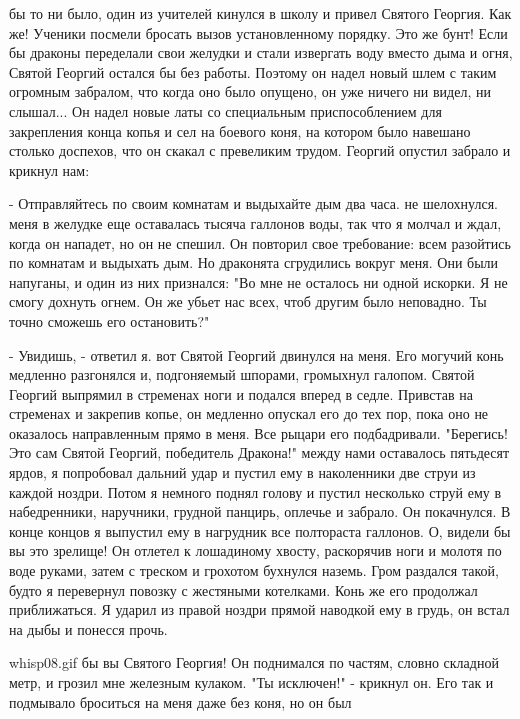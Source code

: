  бы то ни было, один из учителей кинулся в школу и привел 
Святого Георгия. Как же! Ученики посмели бросать вызов установленному 
порядку. Это же бунт! Если бы драконы переделали свои желудки и стали 
извергать воду вместо дыма и огня, Святой Георгий остался бы без 
работы. Поэтому он надел новый шлем с таким огромным забралом, что 
когда оно было опущено, он уже ничего ни видел, ни слышал... Он надел 
новые латы со специальным приспособлением для закрепления конца копья 
и сел на боевого коня, на котором было навешано столько доспехов, что 
он скакал с превеликим трудом.
 Георгий опустил забрало и крикнул нам:
\par- Отправляйтесь по своим комнатам и выдыхайте дым два часа.
 не шелохнулся.
 меня в желудке еще оставалась тысяча галлонов воды, так что я 
молчал и ждал, когда он нападет, но он не спешил. Он повторил свое 
требование: всем разойтись по комнатам и выдыхать дым. Но драконята 
сгрудились вокруг меня. Они были напуганы, и один из них признался: 
"Во мне не осталось ни одной искорки. Я не смогу дохнуть огнем. Он же 
убьет нас всех, чтоб другим было неповадно. Ты точно сможешь его 
остановить?"
\par- Увидишь, - ответил я.
 вот Святой Георгий двинулся на меня. Его могучий конь медленно 
разгонялся и, подгоняемый шпорами, громыхнул галопом. Святой Георгий 
выпрямил в стременах ноги и подался вперед в седле. Привстав на 
стременах и закрепив копье, он медленно опускал его до тех пор, пока 
оно не оказалось направленным прямо в меня. Все рыцари его 
подбадривали. "Берегись! Это сам Святой Георгий, победитель Дракона!"
 между нами оставалось пятьдесят ярдов, я попробовал дальний 
удар и пустил ему в наколенники две струи из каждой ноздри. Потом я 
немного поднял голову и пустил несколько струй ему в набедренники, 
наручники, грудной панцирь, оплечье и забрало. Он покачнулся. В конце 
концов я выпустил ему в нагрудник все полтораста галлонов. О, видели 
бы вы это зрелище! Он отлетел к лошадиному хвосту, раскорячив ноги и 
молотя по воде руками, затем с треском и грохотом бухнулся наземь. 
Гром раздался такой, будто я перевернул повозку с жестяными котелками. 
Конь же его продолжал приближаться. Я ударил из правой ноздри прямой 
наводкой ему в грудь, он встал на дыбы и понесся прочь.
\par{whisp08.gif}
 бы вы Святого Георгия! Он поднимался по частям, словно 
складной метр, и грозил мне железным кулаком. "Ты исключен!" - крикнул 
он. Его так и подмывало броситься на меня даже без коня, но он был 
